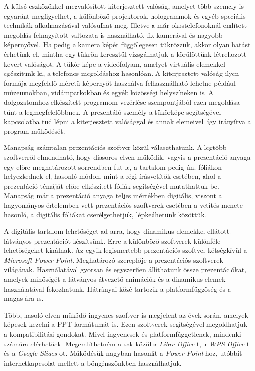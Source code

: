 A külső eszközökkel megvalósított kiterjesztett valóság, amelyet több személy is egyaránt megfigyelhet, a különböző projektorok, hologrammok és egyéb speciális technikák alkalmazásával valósulhat meg. Illetve a már okostelefonoknál említett megoldás felnagyított valtozata is használható, fix kamerával és nagyobb képernyővel. Ha pedig a kamera képét függőlegesen tükrözzük, akkor olyan hatást érhetünk el, mintha egy tükrön keresztül vizsgálhatjuk a körülöttünk létrehozott kevert valóságot. A tükör képe a videófolyam, amelyet virtuális elemekkel egészítünk ki, a telefonos megoldáshoz hasonlóan. A kiterjesztett valóság ilyen formája megfelelő méretű képernyőt használva felhasználható lehetne például múzeumokban, vidámparkokban és egyéb közösségi helyszíneken is. A dolgozatomhoz elkészített programom vezérlése szempontjából ezen megoldása tűnt a legmegfelelőbbnek. A prezentáló személy a tükörképe segítségével kapcsolatba tud lépni a kiterjesztett valósággal és annak elemeivel, így irányítva a program működését.



Manapság számtalan prezentációs szoftver közül választhatunk. A legtöbb szoftverről elmondható, hogy diasoros elven működik, vagyis a prezentáció anyaga egy előre meghatározott sorrendben fut le, a tartalom pedig ún. fóliákon helyezkednek el, hasonló módon, mint a régi írásvetítők esetében, ahol a prezentáció témáját előre elkészített fóliák segítségével mutathattuk be. Manapság már a prezentáció anyaga teljes mértékben digitális, viszont a hagyományos értelemben vett prezentációs szoftverek esetében a vetítés menete hasonló, a digitális fóliákat cserélgethetjük, lépkedhetünk közöttük.

A digitális tartalom lehetőséget ad arra, hogy dinamikus elemekkel ellátott, látványos prezentációt készítsünk. Erre a különböző szoftverek különféle lehetőségeket kínálnak.
Az egyik legismertebb prezentációs szoftver kétségkívül a \textit{Microsoft Power Point}. Meghatározó szereplője a prezentációs szoftverek világának. Használatával gyorsan és egyszerűen állíthatunk össze prezentációkat, amelyek minőségét a látványos átvezető animációk és a dinamikus elemek használatával fokozhatunk. Hátrányai közé tartozik a platformfüggőség és a magas ára is.

Több, hasoló elven működő ingyenes szoftver is megjelent az évek során, amelyek képesek kezelni a PPT formátumát is. Ezen szoftverek segítségével megoldhatjuk a kompatibilitási gondokat. Mivel ingyenesek és platformfüggetlenek, mindenki számára elérhetőek. Megemlíthetném a sok közül a \textit{Libre-Office}-t, a \textit{WPS-Office}-t és a \textit{Google Slides}-ot. Működésük nagyban hasonlít a \textit{Power Point}-hoz, utóbbit internetkapcsolat mellett a böngénszőnkben használhatjuk.

